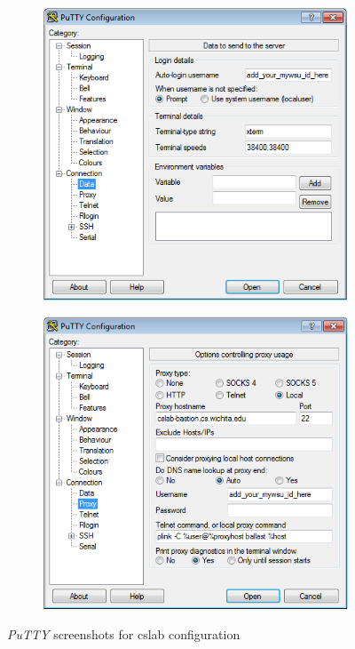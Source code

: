 \documentclass[12pt]{article}
\begin{document}
\begin{flushleft}
\begin{figure}[bh!]
\begin{subfigure}{.5\textwidth}
  \label{fig:sub2}
\end{subfigure}
\begin{subfigure}{.5\textwidth}
  \centering
  \includegraphics[width=.9\linewidth]{putty_cslab_data_tab}
  \label{fig:sub3}
\end{subfigure}%
\begin{subfigure}{.5\textwidth}
  \centering
  \includegraphics[width=.9\linewidth]{putty_cslab_proxy_tab}
  \label{fig:sub4}
\end{subfigure}%
\caption{\textit{PuTTY} screenshots for cslab configuration}
\label{fig:putty_config}
\end{figure}


\end{flushleft}
\end{document}
